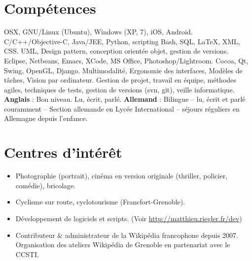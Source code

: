 \documentclass[11pt,a4paper]{moderncv}
\begin{document}
   \section{Compétences}
    {OSX, GNU/Linux (Ubuntu), Windows (XP, 7), iOS, Android.}
    {C/C++/Objective-C, Java/JEE, Python, scripting Bash, SQL, LaTeX, XML, CSS.}
    {UML, Design pattern, conception orientée objet, gestion de versions.}
    {Eclipse, Netbeans, Emacs, XCode, MS Office, Photoshop/Lightroom.}
    {Cocoa, Qt, Swing, OpenGL, Django.}
    {Multimodalité, Ergonomie des interfaces, Modèles de tâches, Vision par ordinateur.}
    {Gestion de projet, travail en équipe, méthodes agiles, techniques de tests, gestion de versions (svn, git), veille informatique.}
    {\textbf{Anglais} : Bon niveau. Lu, écrit, parlé.\newline{}%
   \textbf{Allemand} : Bilingue – lu, écrit et parlé couramment – Section allemande en Lycée International – séjours réguliers en Allemagne depuis l'enfance.}

   \section{Centres d'intérêt}
   \begin{itemize}
      \item {Photographie (portrait), cinéma en version originale (thriller, policier, comédie), bricolage.}
      \item {Cyclisme sur route, cyclotourisme (Francfort-Grenoble).}
      \item {Développement de logiciels et scripts. (Voir \url{http://matthieu.riegler.fr/dev}) }
      \item {Contributeur \& administrateur de la Wikipédia francophone depuis 2007. Organisation des ateliers Wikipédia de Grenoble en partenariat avec le CCSTI.}
   \end{itemize}
\end{document}
